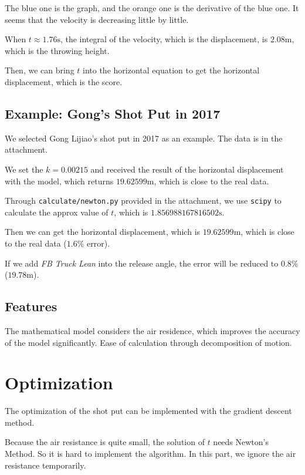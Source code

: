 \documentclass{article}
\begin{document}
The blue one is the graph, and the orange one is the derivative of the blue one. It seems that the velocity is decreasing little by little.

When $t \approx 1.76 \si{\second}$, the integral of the velocity, which is the displacement, is $2.08 \si{\meter}$, which is the throwing height.

Then, we can bring $t$ into the horizontal equation to get the horizontal displacement, which is the score.

\subsection{Example: Gong's Shot Put in 2017}

We selected Gong Lijiao's shot put in 2017 as an example. The data is in the attachment.

We set the $k = 0.00215$ and received the result of the horizontal displacement with the model, which returns $19.62599 \si{\meter}$, which is close to the real data.

Through \texttt{calculate/newton.py} provided in the attachment, we use \texttt{scipy} to calculate the approx value of $t$, which is $1.856988167816502 \si{\second}$.

Then we can get the horizontal displacement, which is $19.62599 \si{\meter}$, which is close to the real data ($1.6\%$ error).

If we add \textit{FB Truck Lean} into the release angle, the error will be reduced to $0.8\%$ ($19.78 \si{\meter}$).

\subsection{Features}

The mathematical model considers the air residence, which improves the accuracy of the model significantly. Ease of calculation through decomposition of motion.

\section{Optimization}

\label{section:optimization}

The optimization of the shot put can be implemented with the gradient descent method.

Because the air resistance is quite small, the solution of $t$ needs Newton's Method. So it is hard to implement the algorithm. In this part, we ignore the air resistance temporarily.
\end{document}
